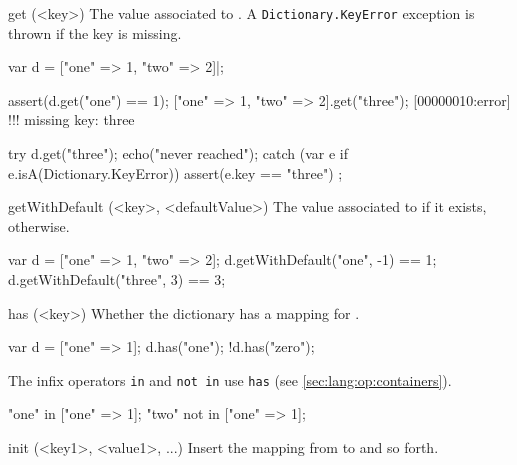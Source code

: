 \begin{urbiscriptapi}




\item[get](<key>)%
  The value associated to .  A \lstinline|Dictionary.KeyError|
  exception is thrown if the key is missing.
\begin{urbiscript}
var d = ["one" => 1, "two" => 2]|;

assert(d.get("one") == 1);
["one" => 1, "two" => 2].get("three");
[00000010:error] !!! missing key: three

try
{
  d.get("three");
  echo("never reached");
}
catch (var e if e.isA(Dictionary.KeyError))
{
  assert(e.key == "three")
};
\end{urbiscript}


\item[getWithDefault](<key>, <defaultValue>)%
  The value associated to  if it exists, 
  otherwise.

\begin{urbiassert}
var d = ["one" => 1, "two" => 2];
d.getWithDefault("one",  -1) == 1;
d.getWithDefault("three", 3) == 3;
\end{urbiassert}


\item[has](<key>)%
  Whether the dictionary has a mapping for .

\begin{urbiassert}
var d = ["one" => 1];
d.has("one");
!d.has("zero");
\end{urbiassert}

  The infix operators \lstinline|in| and \lstinline|not in| use
  \lstinline|has| (see \autoref{sec:lang:op:containers}).

\begin{urbiassert}
"one" in     ["one" => 1];
"two" not in ["one" => 1];
\end{urbiassert}


\item[init](<key1>, <value1>, ...)%
  Insert the mapping from  to  and so forth.


\end{urbiscriptapi}
